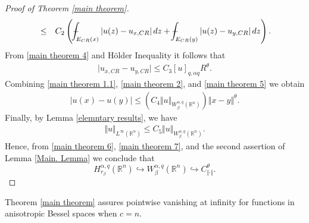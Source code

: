 \documentclass[10pt, leqno]{article}
\def\Xint#1{\mathchoice
{\XXint\displaystyle\textstyle{#1}}
{\XXint\textstyle\scriptstyle{#1}}
{\XXint\scriptstyle\scriptscriptstyle{#1}}
{\XXint\scriptscriptstyle\scriptscriptstyle{#1}}
\!\int}
\def\XXint#1#2#3{{\setbox0=\hbox{$#1{#2#3}{\int}$ }
\vcenter{\hbox{$#2#3$ }}\kern-.6\wd0}}
\def\dashint{\Xint-}
\theoremstyle{definition}
\theoremstyle{remark}
\numberwithin{equation}{section}
\begin{document}
\begin{proof}[Proof of Theorem \ref{main theorem}]
\begin{eqnarray}
& \leq & C_{2} \left( \dashint_{ E_{CR}(x)}\vert u(z) - u_{x, CR}\vert \, dz + \dashint_{E_{CR}(y)}\vert u(z) - u_{y, CR}\vert \, dz \right).
\end{eqnarray}
From \eqref{main theorem 4} and H\" older Inequality it follows that
\begin{eqnarray}
\label{main theorem 5}
\vert u_{x, CR} - u_{y, CR} \vert  \leq  C_{3}\left[ u\right]_{q, \alpha q}R^{\theta}.
\end{eqnarray}
Combining \eqref{main theorem 1.1}, \eqref{main theorem 2}, and \eqref{main theorem 5} we obtain
\begin{eqnarray}
\label{main theorem 6}
\vert u(x) - u(y) \vert \leq \left( C_{4} \Vert u \Vert_{W_{\beta}^{\alpha, q}(\mathbb{R}^{n})} \right) \Vert x - y \Vert^{\theta}.
\end{eqnarray}
Finally, by Lemma \ref{elemntary results}, we have
\begin{eqnarray}
\label{main theorem 7}
\Vert u \Vert_{L^{\infty}\left( \mathbb{R}^{n}\right)} \leq C_{5} \Vert u \Vert_{W_{\beta}^{\alpha, q}(\mathbb{R}^{n})}.
\end{eqnarray}
Hence, from \eqref{main theorem 6}, \eqref{main theorem 7}, and the second assertion of Lemma \ref{Main. Lemma} we conclude that
$$
H_{r_{\beta^{}}}^{\alpha, q}(\mathbb{R}^{n}) \hookrightarrow W_{\beta}^{\alpha, q}(\mathbb{R}^{n}) \hookrightarrow C^{\theta}_{\Vert \cdot \Vert}.
$$
\end{proof}
Theorem \ref{main theorem} assures pointwise vanishing at infinity for functions in anisotropic Bessel spaces when $c = n$.
\end{document}
